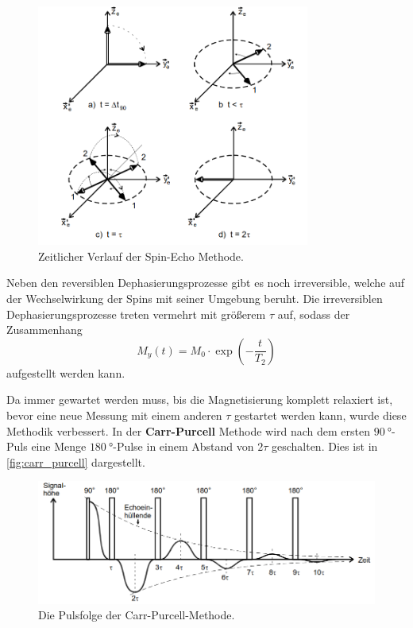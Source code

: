         \begin{figure}
            \centering
            \includegraphics[width=0.8\textwidth]{latex/images/Hahn_echo.png}
            \caption{Zeitlicher Verlauf der Spin-Echo Methode. \cite{finke}}
            \label{fig:hahn}
        \end{figure}

        \noindent Neben den reversiblen Dephasierungsprozesse gibt es noch irreversible, welche auf der Wechselwirkung der Spins mit seiner Umgebung beruht. Die irreversiblen Dephasierungsprozesse 
        treten vermehrt mit größerem $\tau$ auf, sodass der Zusammenhang 
        \begin{equation}
            M_y(t) = M_0 \cdot \exp(-\frac{t}{T_2})
            \label{eqn:expT_2}
        \end{equation}
        aufgestellt werden kann. 
        
        \noindent Da immer gewartet werden muss, bis die Magnetisierung komplett relaxiert ist, bevor eine neue Messung mit einem anderen $\tau$ gestartet werden kann, wurde diese Methodik verbessert. 
        In der \textbf{Carr-Purcell} Methode wird nach dem ersten $\SI{90}{\degree}$-Puls eine Menge $\SI{180}{\degree}$-Pulse in einem Abstand von $2\tau$ geschalten. Dies ist in \autoref{fig:carr_purcell}
        dargestellt. 

        \begin{figure}
            \centering
            \includegraphics[width=\textwidth]{latex/images/Carr_Purcell.png}
            \caption{Die Pulsfolge der Carr-Purcell-Methode. \cite{finke}}
            \label{fig:carr_purcell}
        \end{figure}

